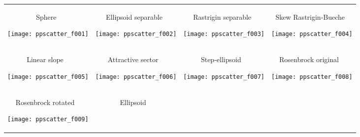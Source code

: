 \documentclass[sigconf]{acmart}
\begin{document}
\begin{figure*}
\begin{tabular}{*{4}{@{}c@{}}}
\begin{turn}{90}\parbox{0.21\textwidth}{\hfill{} Sphere\hfill~}\end{turn}
    \texttt{[image: ppscatter\_f001]}&
\begin{turn}{90}\parbox{0.21\textwidth}{\hfill{} Ellipsoid separable\hfill~}\end{turn} 
    \texttt{[image: ppscatter\_f002]}&
\begin{turn}{90}\parbox{0.21\textwidth}{\hfill{} Rastrigin separable\hfill~}\end{turn} 
    \texttt{[image: ppscatter\_f003]}&
\begin{turn}{90}\parbox{0.21\textwidth}{\hfill{} Skew Rastrigin-Bueche\hfill~}\end{turn} 
    \texttt{[image: ppscatter\_f004]}\\[-2.2ex]
\begin{turn}{90}\parbox{0.21\textwidth}{\hfill{} Linear slope \hfill~}\end{turn} 
    \texttt{[image: ppscatter\_f005]}&
\begin{turn}{90}\parbox{0.21\textwidth}{\hfill{} Attractive sector \hfill~}\end{turn} 
    \texttt{[image: ppscatter\_f006]}&
\begin{turn}{90}\parbox{0.21\textwidth}{\hfill{} Step-ellipsoid \hfill~}\end{turn} 
    \texttt{[image: ppscatter\_f007]}&
\begin{turn}{90}\parbox{0.21\textwidth}{\hfill{} Rosenbrock original \hfill~}\end{turn} 
    \texttt{[image: ppscatter\_f008]}\\[-2.2ex]
\begin{turn}{90}\parbox{0.21\textwidth}{\hfill{} Rosenbrock rotated \hfill~}\end{turn} 
    \texttt{[image: ppscatter\_f009]}&
\begin{turn}{90}\parbox{0.21\textwidth}{\hfill{} Ellipsoid \hfill~}\end{turn} 

\end{tabular}
\end{figure*}
\end{document}
